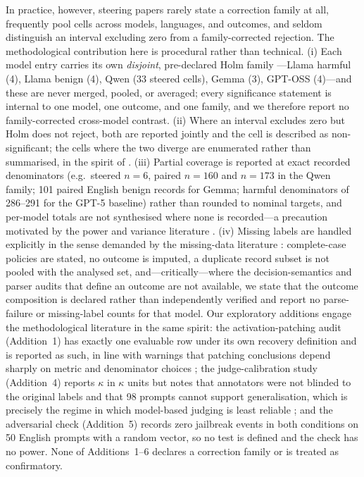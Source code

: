 In practice, however, steering papers rarely state a correction family at all,
frequently pool cells across models, languages, and outcomes, and seldom
distinguish an interval excluding zero from a family-corrected rejection. The
methodological contribution here is procedural rather than technical. (i) Each
model entry carries its own \emph{disjoint}, pre-declared Holm family
\citep{holm1979simple}---Llama harmful (4), Llama benign (4), Qwen (33 steered
cells), Gemma (3), GPT-OSS (4)---and these are never merged, pooled, or
averaged; every significance statement is internal to one model, one outcome,
and one family, and we therefore report no family-corrected cross-model
contrast. (ii) Where an interval excludes zero but Holm does not reject, both
are reported jointly and the cell is described as non-significant; the cells
where the two diverge are enumerated rather than summarised, in the spirit of
\citet{dror2018hitchhiker}. (iii) Partial coverage is reported at exact recorded
denominators (e.g.\ steered $n=6$, paired $n=160$ and $n=173$ in the Qwen
family; 101 paired English benign records for Gemma; harmful denominators of
286--291 for the GPT-5 baseline) rather than rounded to nominal targets, and
per-model totals are not synthesised where none is recorded---a precaution
motivated by the power and variance literature
\citep{card2020little,bouthillier2021accounting}. (iv) Missing labels are
handled explicitly in the sense demanded by the missing-data literature
\citep{rubin1976inference,little2019statistical}: complete-case policies are
stated, no outcome is imputed, a duplicate record subset is not pooled with the
analysed set, and---critically---where the decision-semantics and parser audits
that define an outcome are not available, we state that the outcome composition
is declared rather than independently verified and report no parse-failure or
missing-label counts for that model. Our exploratory additions engage the
methodological literature in the same spirit: the activation-patching audit
(Addition~1) has exactly one evaluable row under its own recovery definition and
is reported as such, in line with warnings that patching conclusions depend
sharply on metric and denominator choices
\citep{meng2022locating,vig2020investigating,zhang2024towards,heimersheim2024use};
the judge-calibration study (Addition~4) reports $\kappa$ in $\kappa$ units
\citep{cohen1960coefficient} but notes that annotators were not blinded to the
original labels and that 98 prompts cannot support generalisation, which is
precisely the regime in which model-based judging is least reliable
\citep{zheng2023judging}; and the adversarial check (Addition~5) records zero
jailbreak events in both conditions on 50 English prompts with a random vector,
so no test is defined and the check has no power. None of Additions~1--6
declares a correction family or is treated as confirmatory.

